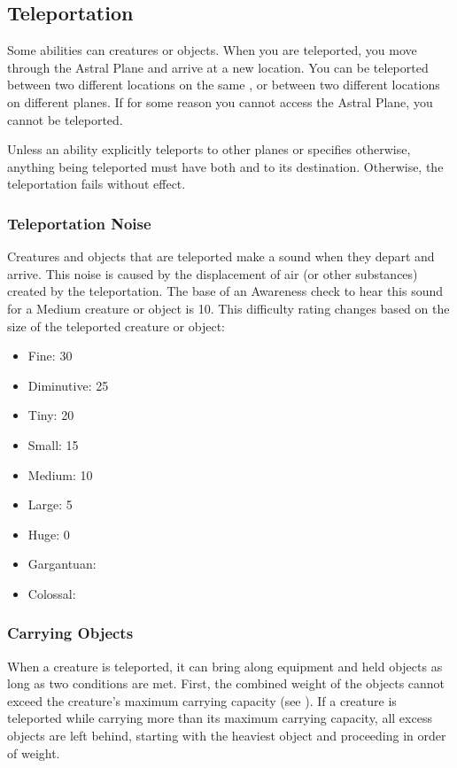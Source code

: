     \subsection{Teleportation}\label{Teleportation}
        Some abilities can  creatures or objects.
        When you are teleported, you move through the Astral Plane and arrive at a new location.
        You can be teleported between two different locations on the same , or between two different locations on different planes.
        If for some reason you cannot access the Astral Plane, you cannot be teleported.

        Unless an ability explicitly teleports to other planes or specifies otherwise, anything being teleported must have both  and  to its destination.
        Otherwise, the teleportation fails without effect.

        \subsubsection{Teleportation Noise}\label{Teleportation Noise}
            Creatures and objects that are teleported make a sound when they depart and arrive.
            This noise is caused by the displacement of air (or other substances) created by the teleportation.
            The base  of an Awareness check to hear this sound for a Medium creature or object is 10.
            This difficulty rating changes based on the size of the teleported creature or object:

            \begin{itemize}
                \item Fine: 30
                \item Diminutive: 25
                \item Tiny: 20
                \item Small: 15
                \item Medium: 10
                \item Large: 5
                \item Huge: 0
                \item Gargantuan: 
                \item Colossal: 
            \end{itemize}

        \subsubsection{Carrying Objects}
            When a creature is teleported, it can bring along equipment and held objects as long as two conditions are met.
            First, the combined weight of the objects cannot exceed the creature's maximum carrying capacity (see ).
            If a creature is teleported while carrying more than its maximum carrying capacity, all excess objects are left behind, starting with the heaviest object and proceeding in order of weight.


